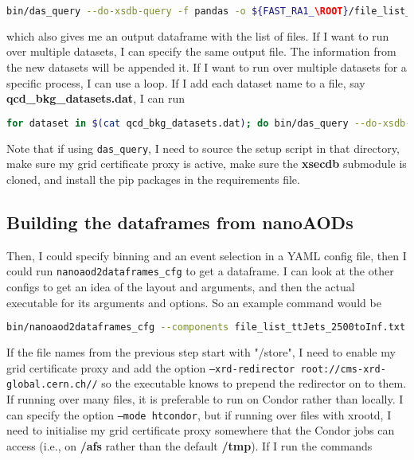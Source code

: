 \begin{lstlisting}[belowskip=-0.7cm, language=sh, numbers=none]
bin/das_query --do-xsdb-query -f pandas -o ${FAST_RA1_\ROOT}/file_list_ttJets_2500toInf.txt /TTJets_HT-2500toInf_TuneCUETP8M1_13TeV-madgraphMLM-pythia8/RunIISummer16NanoAOD-PUMoriond17_05Feb2018_94X_mcRun2_asymptotic_v2_ext1-v1/NANOAODSIM
\end{lstlisting}

which also gives me an output dataframe with the list of files. If I want to run over multiple datasets, I can specify the same output file. The information from the new datasets will be appended it. If I want to run over multiple datasets for a specific process, I can use a loop. If I add each dataset name to a file, say \textbf{qcd\_bkg\_datasets.dat}, I can run

\begin{lstlisting}[belowskip=-0.7cm, language=sh, numbers=none]
for dataset in $(cat qcd_bkg_datasets.dat); do bin/das_query --do-xsdb-query -f pandas -o ./qcd_bkg_file_list.txt $dataset; done
\end{lstlisting}

Note that if using \texttt{das\_query}, I need to source the setup script in that directory, make sure my grid certificate proxy is active, make sure the \textbf{xsecdb} submodule is cloned, and install the pip packages in the requirements file.


\subsection{Building the dataframes from nanoAODs}

Then, I could specify binning and an event selection in a YAML config file, then I could run \texttt{nanoaod2dataframes\_cfg} to get a dataframe. I can look at the other configs to get an idea of the layout and arguments, and then the actual executable for its arguments and options. So an example command would be

\begin{lstlisting}[belowskip=-0.7cm, language=sh, numbers=none]
bin/nanoaod2dataframes_cfg --components file_list_ttJets_2500toInf.txt --dont-use-nanoaodtools -o single_top_test fast_ra1/trees_to_dataframe/configs/nanoaod_esh_ttH.yaml
\end{lstlisting}

If the file names from the previous step start with "/store", I need to enable my grid certificate proxy and add the option \texttt{--xrd-redirector root://cms-xrd-global.cern.ch//} so the executable knows to prepend the redirector on to them. If running over many files, it is preferable to run on Condor rather than locally. I can specify the option \texttt{--mode htcondor}, but if running over files with xrootd, I need to initialise my grid certificate proxy somewhere that the Condor jobs can access (i.e., on \textbf{/afs} rather than the default \textbf{/tmp}). If I run the commands

